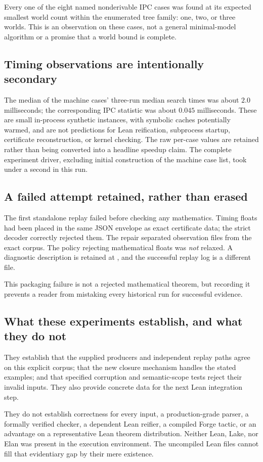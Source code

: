 Every one of the eight named nonderivable IPC cases was found at its expected
smallest world count within the enumerated tree family: one, two, or three
worlds. This is an observation on these cases, not a general minimal-model
algorithm or a promise that a world bound is complete.

\subsection{Timing observations are intentionally secondary}
The median of the machine cases' three-run median search times was about
$2.0$ milliseconds; the corresponding IPC statistic was about $0.045$
milliseconds. These are small in-process synthetic instances, with symbolic
caches potentially warmed, and are not predictions for Lean reification,
subprocess startup, certificate reconstruction, or kernel checking. The raw
per-case values are retained rather than being converted into a headline
speedup claim. The complete experiment driver, excluding initial construction
of the machine case list, took under a second in this run.

\subsection{A failed attempt retained, rather than erased}
The first standalone replay failed before checking any mathematics. Timing
floats had been placed in the same JSON envelope as exact certificate data;
the strict decoder correctly rejected them. The repair separated observation
files from the exact corpus. The policy rejecting mathematical floats was
\emph{not} relaxed. A diagnostic description is retained at
, and the successful
replay log is a different file.

This packaging failure is not a rejected mathematical theorem, but recording it
prevents a reader from mistaking every historical run for successful evidence.

\subsection{What these experiments establish, and what they do not}
They establish that the supplied producers and independent replay paths agree
on this explicit corpus; that the new closure mechanism handles the stated
examples; and that specified corruption and semantic-scope tests reject their
invalid inputs. They also provide concrete data for the next Lean integration
step.

They do not establish correctness for every input, a production-grade parser,
a formally verified checker, a dependent Lean reifier, a compiled Forge tactic,
or an advantage on a representative Lean theorem distribution. Neither Lean,
Lake, nor Elan was present in the execution environment. The uncompiled Lean
files cannot fill that evidentiary gap by their mere existence.

